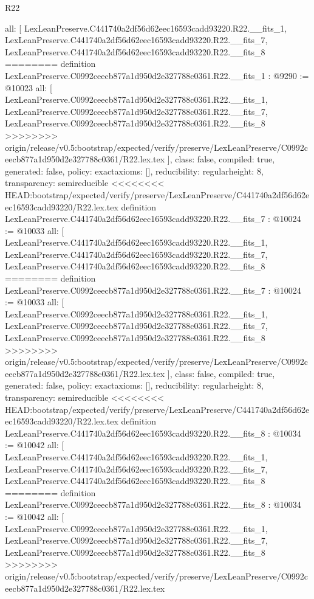 \begin{lexlean}{R22}
\begin{coremodule}
{{{{{{{{{{{{{{{{{{{{{{{{{{{{{{{{{{{{{{{{  all: [
    LexLeanPreserve.C441740a2df56d62eec16593cadd93220.R22.__fits_1,
    LexLeanPreserve.C441740a2df56d62eec16593cadd93220.R22.__fits_7,
    LexLeanPreserve.C441740a2df56d62eec16593cadd93220.R22.__fits_8
========
definition LexLeanPreserve.C0992ceecb877a1d950d2e327788c0361.R22.__fits_1 : @9290 := @10023 {
  all: [
    LexLeanPreserve.C0992ceecb877a1d950d2e327788c0361.R22.__fits_1,
    LexLeanPreserve.C0992ceecb877a1d950d2e327788c0361.R22.__fits_7,
    LexLeanPreserve.C0992ceecb877a1d950d2e327788c0361.R22.__fits_8
>>>>>>>> origin/release/v0.5:bootstrap/expected/verify/preserve/LexLeanPreserve/C0992ceecb877a1d950d2e327788c0361/R22.lex.tex
  ],
  class: false,
  compiled: true,
  generated: false,
  policy: exact{axioms: []},
  reducibility: regular{height: 8},
  transparency: semireducible
}
<<<<<<<< HEAD:bootstrap/expected/verify/preserve/LexLeanPreserve/C441740a2df56d62eec16593cadd93220/R22.lex.tex
definition LexLeanPreserve.C441740a2df56d62eec16593cadd93220.R22.__fits_7 : @10024 := @10033 {
  all: [
    LexLeanPreserve.C441740a2df56d62eec16593cadd93220.R22.__fits_1,
    LexLeanPreserve.C441740a2df56d62eec16593cadd93220.R22.__fits_7,
    LexLeanPreserve.C441740a2df56d62eec16593cadd93220.R22.__fits_8
========
definition LexLeanPreserve.C0992ceecb877a1d950d2e327788c0361.R22.__fits_7 : @10024 := @10033 {
  all: [
    LexLeanPreserve.C0992ceecb877a1d950d2e327788c0361.R22.__fits_1,
    LexLeanPreserve.C0992ceecb877a1d950d2e327788c0361.R22.__fits_7,
    LexLeanPreserve.C0992ceecb877a1d950d2e327788c0361.R22.__fits_8
>>>>>>>> origin/release/v0.5:bootstrap/expected/verify/preserve/LexLeanPreserve/C0992ceecb877a1d950d2e327788c0361/R22.lex.tex
  ],
  class: false,
  compiled: true,
  generated: false,
  policy: exact{axioms: []},
  reducibility: regular{height: 8},
  transparency: semireducible
}
<<<<<<<< HEAD:bootstrap/expected/verify/preserve/LexLeanPreserve/C441740a2df56d62eec16593cadd93220/R22.lex.tex
definition LexLeanPreserve.C441740a2df56d62eec16593cadd93220.R22.__fits_8 : @10034 := @10042 {
  all: [
    LexLeanPreserve.C441740a2df56d62eec16593cadd93220.R22.__fits_1,
    LexLeanPreserve.C441740a2df56d62eec16593cadd93220.R22.__fits_7,
    LexLeanPreserve.C441740a2df56d62eec16593cadd93220.R22.__fits_8
========
definition LexLeanPreserve.C0992ceecb877a1d950d2e327788c0361.R22.__fits_8 : @10034 := @10042 {
  all: [
    LexLeanPreserve.C0992ceecb877a1d950d2e327788c0361.R22.__fits_1,
    LexLeanPreserve.C0992ceecb877a1d950d2e327788c0361.R22.__fits_7,
    LexLeanPreserve.C0992ceecb877a1d950d2e327788c0361.R22.__fits_8
>>>>>>>> origin/release/v0.5:bootstrap/expected/verify/preserve/LexLeanPreserve/C0992ceecb877a1d950d2e327788c0361/R22.lex.tex
}}}}}}}}}}}}}}}}}}}}}}}}}}}}}}}}}}}}}}}}}}}
\end{coremodule}
\end{lexlean}
